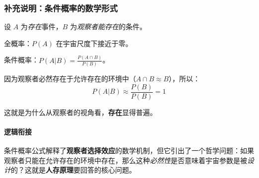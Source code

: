 	\subsubsection*{补充说明：条件概率的数学形式}
	\begin{tcolorbox}[
		colback=gray!5,
		colframe=gray!40,
		title=\small \textit{严谨推导（可跳过）},
		fonttitle=\bfseries
		]
		\small
		设 $A$ 为\textit{存在}事件，$B$ 为\textit{观察者能存在}的条件。

		全概率：$P(A)$ 在宇宙尺度下接近于零。

		条件概率：$P(A|B) = \frac{P(A \cap B)}{P(B)}$。

		因为观察者必然存在于允许存在的环境中（$A \cap B \approx B$），所以：
		\[ P(A|B) \approx \frac{P(B)}{P(B)} = 1 \]

		这就是为什么从观察者的视角看，\textbf{存在}显得普遍。
	\end{tcolorbox}

	\paragraph*{逻辑衔接}
	条件概率公式解释了\textbf{观察者选择效应}的数学机制，但它引出了一个哲学问题：如果观察者只能在允许存在的环境中存在，那么这种\textit{必然性}是否意味着宇宙参数是被\textit{设计}的？这就是\textbf{人存原理}要回答的核心问题。

